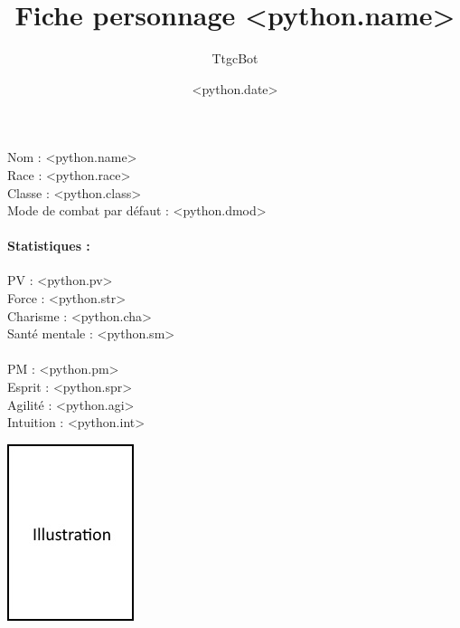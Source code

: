 \documentclass[12pt,a4paper]{report}
\title{Fiche personnage <python.name>}
\author{TtgcBot}
\date{<python.date>}
\begin{document}
\fancyhf{}
\renewcommand{\headrulewidth}{0pt}

\begin{multicols}{2}
\begin{minipage}{1.25\linewidth}%
\raggedright
Nom : <python.name> \\[4pt]
Race : <python.race> \\[4pt]
Classe : <python.class> \\[4pt]
Mode de combat par d\'efaut : <python.dmod> \\[4pt]

\paragraph{Statistiques :}
\begin{multicols}{2}%
\setlength{\columnsep}{40pt}
\begin{minipage}{1\linewidth}%
\raggedright
\vskip 4pt
PV : <python.pv> \\[4pt]
Force : <python.str> \\[4pt]
Charisme : <python.cha> \\[4pt]
Sant\'e mentale : <python.sm> \\[4pt]
\end{minipage}%
\columnbreak
\paragraph{}
\begin{minipage}{1\linewidth}%
\raggedright
\vskip 4pt
PM : <python.pm> \\[4pt]
Esprit : <python.spr> \\[4pt]
Agilit\'e : <python.agi> \\[4pt]
Intuition : <python.int> \\[4pt]
\end{minipage}%
\end{multicols}%
\end{minipage}%

\columnbreak

\begin{flushright}
    \includegraphics[scale=1]{empty-FR.jpg}
\end{flushright}

\end{multicols}
\end{document}
